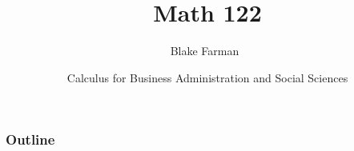\documentclass{beamer}
\title %
    {Math 122}
\author[Farman]
{Blake Farman~\inst{1}}
\institute[USC]{
\inst{1}
University of South Carolina, Columbia, SC USA}
\date[January 17, 2017]
{Calculus for Business Administration and Social Sciences}
\theoremstyle{definition}
\begin{document}
\begin{frame}
  \titlepage
\end{frame}

\begin{frame}
  \frametitle{Outline}
  \tableofcontents[pausesections]
\end{frame}

%
\end{document}
